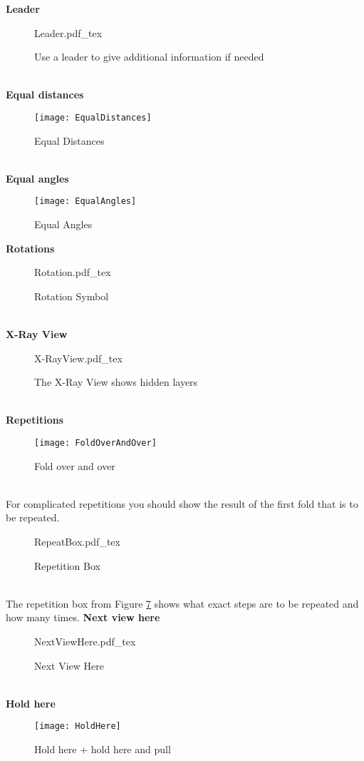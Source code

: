 \textbf{Leader}
\begin{figure}[h]
	\centering
	\def\svgwidth{0.3\textwidth}
	{Leader.pdf_tex}
	\caption{Use a leader to give additional information if needed}
	\label{fig:leader}
\end{figure}\\
%
\textbf{Equal distances}
\begin{figure}[h]
	\centering
	\texttt{[image: EqualDistances]}
	\caption{Equal Distances}
	\label{fig:equalDistances}
\end{figure}\\
%
\textbf{Equal angles}
\begin{figure}[h]
	\centering
	\texttt{[image: EqualAngles]}
	\caption{Equal Angles}
	\label{fig:equalAngles}
\end{figure}
\newpage
%
\textbf{Rotations }
\begin{figure}[h]
	\centering
	\def\svgwidth{0.2\textwidth}
	{Rotation.pdf_tex}
	\caption{Rotation Symbol}
	\label{fig:rotation}
\end{figure}\\
%
\textbf{X-Ray View}
\begin{figure}[h]
	\centering
	\def\svgwidth{0.7\textwidth}
	{X-RayView.pdf_tex}
	\caption{The X-Ray View shows hidden layers}
	\label{fig:x-rayView}
\end{figure}\\
%
\textbf{Repetitions }
\begin{figure}[h]
	\centering
	\texttt{[image: FoldOverAndOver]}
	\caption{Fold over and over}
	\label{fig:foldOverAndOver}
\end{figure}\\
For complicated repetitions you should show the result of the first fold that is to be repeated.
%
\begin{figure}[h]
	\centering
	\def\svgwidth{0.3\textwidth}
	{RepeatBox.pdf_tex}
	\caption{Repetition Box}
	\label{fig:repeatBox}
\end{figure}\\
The repetition box from Figure \ref{fig:repeatBox} shows what exact steps are to be repeated and how many times.\newpage
\textbf{Next view here}
\begin{figure}[h]
	\centering
	\def\svgwidth{0.6\textwidth}
	{NextViewHere.pdf_tex}
	\caption{Next View Here}
	\label{fig:nextViewHere}
\end{figure}
\\
\textbf{Hold here}
\begin{figure}[h]
	\centering
	\texttt{[image: HoldHere]}
	\caption{Hold here + hold here and pull}
	\label{fig:holdHere}
\end{figure}\\

